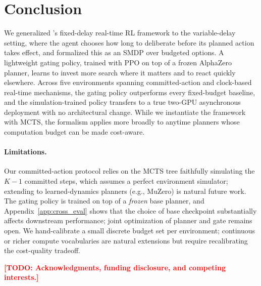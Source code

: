 \documentclass{article}
\newcommand{\todo}[1]{\textcolor{red}{\textbf{[TODO: #1]}}}
\begin{document}
\section{Conclusion}

We generalized \citet{ramstedt2019rtrl}'s fixed-delay real-time RL
framework to the variable-delay setting, where the agent chooses how
long to deliberate before its planned action takes effect, and
formalized this as an SMDP over budgeted options.
A lightweight gating policy, trained with PPO on top of a frozen
AlphaZero planner, learns to invest more search where it matters and
to react quickly elsewhere.
Across five environments spanning committed-action and clock-based
real-time mechanisms, the gating policy outperforms every fixed-budget
baseline, and the simulation-trained policy transfers to a true
two-GPU asynchronous deployment with no architectural change.
While we instantiate the framework with MCTS, the formalism applies
more broadly to anytime planners whose computation budget can be made
cost-aware.

\paragraph{Limitations.}
Our committed-action protocol relies on the MCTS tree faithfully
simulating the $K{-}1$ committed steps, which assumes a perfect
environment simulator; extending to learned-dynamics planners
(e.g., MuZero) is natural future work.
The gating policy is trained on top of a \emph{frozen} base planner,
and Appendix~\ref{app:cross_eval} shows that the choice of base
checkpoint substantially affects downstream performance; joint
optimization of planner and gate remains open.
We hand-calibrate a small discrete budget set per environment;
continuous or richer compute vocabularies are natural extensions but
require recalibrating the cost-quality tradeoff.


\begin{ack}
\todo{Acknowledgments, funding disclosure, and competing interests.}
\end{ack}







\appendix
\end{document}
